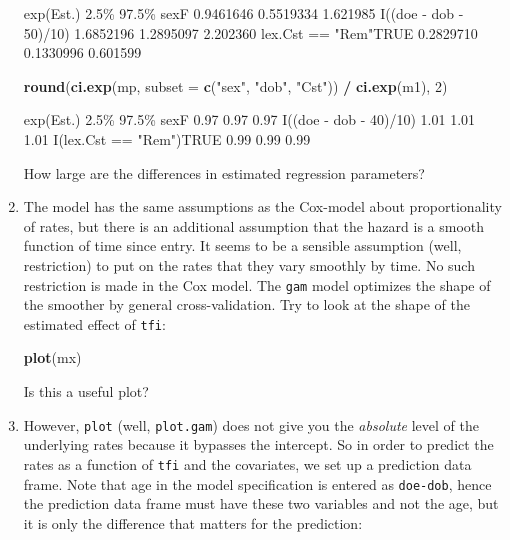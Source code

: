 \documentclass[
]{book}
\newenvironment{Shaded}{\begin{snugshade}}{\end{snugshade}}
\newcommand{\AttributeTok}[1]{\textcolor[rgb]{0.13,0.29,0.53}{#1}}
\newcommand{\DecValTok}[1]{\textcolor[rgb]{0.00,0.00,0.81}{#1}}
\newcommand{\FunctionTok}[1]{\textcolor[rgb]{0.13,0.29,0.53}{\textbf{#1}}}
\newcommand{\NormalTok}[1]{#1}
\newcommand{\SpecialCharTok}[1]{\textcolor[rgb]{0.81,0.36,0.00}{\textbf{#1}}}
\newcommand{\StringTok}[1]{\textcolor[rgb]{0.31,0.60,0.02}{#1}}
\begin{document}
\begin{enumerate}
\begin{Shaded}
\begin{Highlighting}[]
\NormalTok{                       exp(Est.)      2.5\%    97.5\%}
\NormalTok{sexF                   0.9461646 0.5519334 1.621985}
\NormalTok{I((doe {-} dob {-} 50)/10) 1.6852196 1.2895097 2.202360}
\NormalTok{lex.Cst == "Rem"TRUE   0.2829710 0.1330996 0.601599}
\end{Highlighting}
\end{Shaded}

\begin{Shaded}
\begin{Highlighting}[]
\FunctionTok{round}\NormalTok{(}\FunctionTok{ci.exp}\NormalTok{(mp, }\AttributeTok{subset =} \FunctionTok{c}\NormalTok{(}\StringTok{"sex"}\NormalTok{, }\StringTok{"dob"}\NormalTok{, }\StringTok{"Cst"}\NormalTok{)) }\SpecialCharTok{/} \FunctionTok{ci.exp}\NormalTok{(m1), }\DecValTok{2}\NormalTok{)}
\end{Highlighting}
\end{Shaded}

\begin{Shaded}
\begin{Highlighting}[]
\NormalTok{                        exp(Est.) 2.5\% 97.5\%}
\NormalTok{sexF                         0.97 0.97  0.97}
\NormalTok{I((doe {-} dob {-} 40)/10)       1.01 1.01  1.01}
\NormalTok{I(lex.Cst == "Rem")TRUE      0.99 0.99  0.99}
\end{Highlighting}
\end{Shaded}

  How large are the differences in estimated regression parameters?
\item
  The model has the same assumptions as the Cox-model about
  proportionality of rates, but there is an additional assumption that
  the hazard is a smooth function of time since entry. It seems to be
  a sensible assumption (well, restriction) to put on the rates that
  they vary smoothly by time. No such restriction is made in the Cox
  model. The \texttt{gam} model optimizes the shape of the smoother by
  general cross-validation. Try to look at the shape of the
  estimated effect of \texttt{tfi}:

\begin{Shaded}
\begin{Highlighting}[]
\FunctionTok{plot}\NormalTok{(mx)}
\end{Highlighting}
\end{Shaded}

  Is this a useful plot?
\item
  However, \texttt{plot} (well, \texttt{plot.gam}) does not give you the \emph{absolute}
  level of the underlying rates because it bypasses the intercept. So
  in order to predict the rates as a function of \texttt{tfi} and the
  covariates, we set up a prediction data frame. Note that age
  in the model specification is entered as \texttt{doe-dob}, hence
  the prediction data frame must have these two variables and not
  the age, but it is only the difference that matters for the prediction:


\end{enumerate}
\end{document}
